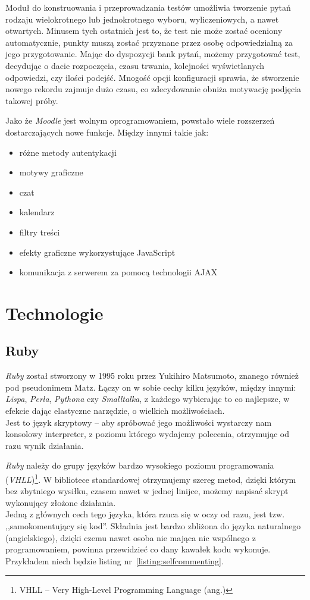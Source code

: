 \documentclass[a4paper,12pt]{article}
\begin{document}
Moduł do konstruowania i przeprowadzania testów umożliwia tworzenie pytań rodzaju
wielokrotnego lub jednokrotnego wyboru, wyliczeniowych, a nawet otwartych. Minusem tych
ostatnich jest to, że test nie może zostać oceniony automatycznie, punkty muszą zostać
przyznane przez osobę odpowiedzialną za jego przygotowanie. Mając do dyspozycji bank
pytań, możemy przygotować test, decydując o dacie rozpoczęcia, czasu trwania, kolejności
wyświetlanych odpowiedzi, czy ilości podejść. Mnogość opcji konfiguracji sprawia, że
stworzenie nowego rekordu zajmuje dużo czasu, co zdecydowanie obniża motywację podjęcia
takowej próby.


Jako że \emph{Moodle} jest wolnym oprogramowaniem, powstało wiele rozszerzeń
dostarczających nowe funkcje. Między innymi takie jak:

\begin{itemize}
  \item{różne metody autentykacji}
  \item{motywy graficzne}
  \item{czat}
  \item{kalendarz}
  \item{filtry treści}
  \item{efekty graficzne wykorzystujące JavaScript}
  \item{komunikacja z serwerem za pomocą technologii AJAX}
\end{itemize}

\clearpage
\section{Technologie}
\subsection{Ruby}
\emph{Ruby} został stworzony w 1995 roku przez Yukihiro Matsumoto, znanego również
pod pseudonimem Matz. Łączy on w sobie cechy kilku języków, między innymi: \emph{Lispa},
\emph{Perla}, \emph{Pythona} czy \emph{Smalltalka}, z każdego wybierając to co najlepsze,
w efekcie dając elastyczne narzędzie, o wielkich możliwościach.\\
Jest to język skryptowy -- aby spróbować jego możliwości wystarczy nam konsolowy
interpreter, z poziomu którego wydajemy polecenia, otrzymując od razu wynik działania.


\emph{Ruby} należy do grupy języków bardzo wysokiego poziomu programowania
(\emph{VHLL})\footnote{VHLL -- Very High-Level Programming Language (ang.)}.
W bibliotece standardowej otrzymujemy szereg metod, dzięki którym bez zbytniego wysiłku,
czasem nawet w jednej linijce, możemy napisać skrypt wykonujący złożone działania.\\
Jedną z głównych cech tego języka, która rzuca się w oczy od razu, jest tzw.
,,samokomentujący się kod''. Składnia jest bardzo zbliżona do języka naturalnego
(angielskiego), dzięki czemu nawet osoba nie mająca nic wspólnego z programowaniem,
powinna przewidzieć co dany kawałek kodu wykonuje. Przykładem niech będzie
listing nr~\ref{listing:selfcommenting}.
\end{document}
